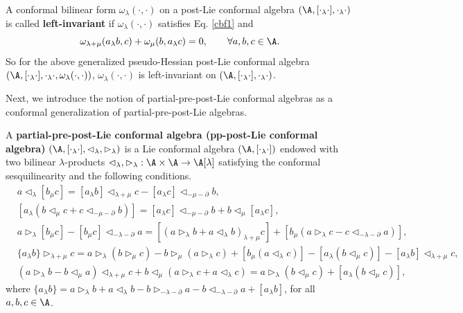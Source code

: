\documentclass[12pt]{amsart}
\begin{document}
 
\begin{remark}
A conformal bilinear form $\omega_{\lambda}(\cdot,\cdot)$ on a post-Lie conformal algebra $(\A,[\cdot_\lambda\cdot],\cdot_\lambda\cdot)$ is called {\bf left-invariant} if $\omega_{\lambda}(\cdot,\cdot)$ satisfies Eq. \eqref{cbf1} and
\begin{equation}\label{cbf3}
    \omega_{\lambda+\mu}(a_\lambda b,c)+\omega_\mu(b,a_\lambda c)=0, \qquad \forall a,b,c\in \A.
\end{equation}
 So for the above generalized pseudo-Hessian post-Lie conformal
algebra $(\A,[\cdot_\lambda\cdot],\cdot_\lambda\cdot,
\omega_\lambda(\cdot,\cdot)) $, $\omega_{\lambda}(\cdot,\cdot)$ is
left-invariant on $(\A,[\cdot_\lambda\cdot],\cdot_\lambda\cdot)$.
\end{remark}
Next, we introduce the notion of partial-pre-post-Lie conformal algebras as a conformal generalization of  partial-pre-post-Lie algebras. %
\begin{definition} \label{df-ppplc}
A {\bf partial-pre-post-Lie conformal algebra (pp-post-Lie
conformal algebra)}
$(\A,[\cdot_\lambda\cdot],\lhd_\lambda,\rhd_\lambda)$ is a  Lie
conformal algebra $(\A,[\cdot_\lambda\cdot])$ endowed with two
bilinear $\lambda$-products $\lhd_\lambda,\rhd_\lambda: \A\times\A
\rightarrow \A[\lambda]$ satisfying the conformal sesquilinearity
and the following conditions.
\begin{align}
    \label{pppl1}   &a\lhd_\lambda[b_\mu c]=[a_\lambda b]\lhd_{\lambda+\mu}c-[a_\lambda c]\lhd_{-\mu-\partial}b,\\
    \label{pppl2}   &[a_\lambda (b\lhd_\mu c+c\lhd_{-\mu-\partial} b)]=[a_\lambda c]\lhd_{-\mu-\partial}b+b\lhd_\mu [a_\lambda c],\\
    \label{pppl3}   &a\rhd_\lambda[b_\mu c]-[b_\mu c]\lhd_{-\lambda-\partial}a=[(a\rhd_\lambda b+a\lhd_\lambda b)_{\lambda+\mu}c]+[b_\mu (a\rhd_\lambda c-c\lhd_{-\lambda-\partial}a)],\\
    \label{pppl4}   &\{a_\lambda b\}\rhd_{\lambda+\mu}c=a\rhd_\lambda(b\rhd_\mu c)-b\rhd_\mu(a\rhd_\lambda c)+[b_\mu(a\lhd_\lambda c)]-[a_\lambda (b\lhd_\mu c)]-[a_\lambda b]\lhd_{\lambda+\mu}c,\\
    \label{pppl5}   &(a\rhd_\lambda b-b\lhd_\mu a)\lhd_{\lambda+\mu}c+b\lhd_\mu(a\rhd_\lambda c+a\lhd_\lambda c)=a\rhd_\lambda(b\lhd_\mu c)+[a_\lambda(b\lhd_\mu c)],
\end{align}
where $\{a_\lambda b\}= a\rhd_\lambda b +a\lhd_\lambda
b-b\rhd_{-\lambda-\partial} a-b\lhd_{-\lambda-\partial}
a+[a_\lambda b]$, for all $a,b,c\in \A$.
\end{definition}
\end{document}
